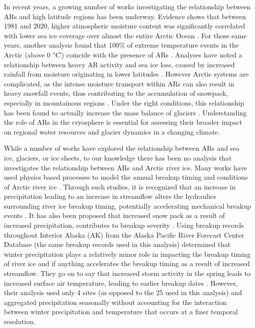 \documentclass[12pts,draft]{AR_analysis_}
\begin{document}
In recent years, a growing number of works 
investigating the relationship between ARs and 
high latitude regions has been underway. Evidence shows that between
1981 and 2020, higher atmospheric moisture content was significantly correlated
with lower sea ice coverage over almost the entire Arctic Ocean
\cite{ARs_lead_to_sea_ice_loss}. For those same years, another analysis
found that 100\% of extreme temperature events in the Arctic (above 0
$\degree C$) coincide with the presence of ARs \cite{Ma2023}. Analyses have noted
a relationship between heavy AR activity and sea ice loss, caused by
increased rainfall from moisture originating in lower latitudes
\cite{Zhang2023, maclennan_contribution_2022}. However Arctic systems
are complicated, as the intense moisture transport within ARs can also
result in heavy snowfall events, thus contributing to the accumulation
of snowpack, especially in mountainous regions \cite{Saavedra2020,
Guan2010}. Under the right conditions, this relationship has been found
to actually increase the mass balance of glaciers \cite{Little2019}.
Understanding the role of ARs in the cryosphere is essential for
assessing their broader impact on regional water resources and glacier
dynamics in a changing climate. 

While a number of works have explored
the relationship between ARs and sea ice, glaciers, or ice sheets, 
to our knowledge there has
been no analysis that investigates the relationship between ARs and Arctic
river ice. Many works have used physics based processes
to model the annual breakup timing and conditions of Arctic river ice
\cite{Paily, ashton1986river, Prowse_Bonsal_Duguay_Lacroix_2007,
jasek1998, shen_newest}. Through such studies, it is recognized that an 
increase in precipitation leading to an increase in
streamflow alters the hydraulics surrounding river ice breakup timing, 
potentially accelerating mechanical breakup events \cite{ashton1986river}.
It has also been proposed that increased snow pack as a result of increased 
precipitation, contributes to breakup severity \cite{Prowes2002}. Using 
breakup records throughout Interior Alaska (AK) from the Alaska 
Pacific River Forecast Center Database
(the same breakup records used in this analysis)  determined 
that winter precipitation plays a relatively minor role in impacting the 
breakup timing of river ice and if anything accelerates the breakup timing as a 
result of increased streamflow. They go on to say that 
increased storm activity in the spring leads to increased surface air 
temperature, leading to earlier breakup dates \cite{Bieniek2011}. However, 
their analysis used only 4 sites (as opposed to the 25 used in this analysis) 
and aggregated precipitation seasonally without accounting for the interaction 
between winter precipitation and temperature that occurs at a finer temporal
resolution. 
\end{document}
